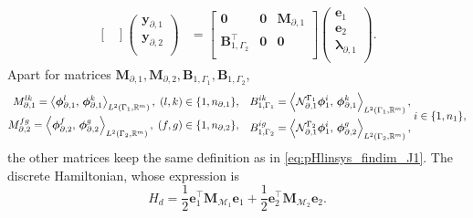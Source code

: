 \begin{equation}
\begin{aligned}
\begin{bmatrix}
\end{bmatrix}
\begin{pmatrix}
\mathbf{y}_{\partial, 1} \\
\mathbf{y}_{\partial, 2} \\
\end{pmatrix}
&= \begin{bmatrix}
\mathbf{0} & \mathbf{0} & \mathbf{M}_{\partial, 1} \\
\mathbf{B}_{1, \Gamma_2}^\top & \mathbf{0} & \mathbf{0} \\
\end{bmatrix}\begin{pmatrix}
\mathbf{e}_{1} \\
\mathbf{e}_{2} \\
{\bm{\lambda}}_{\partial, 1} \\
\end{pmatrix}.
\end{aligned}
\end{equation}
Apart for matrices $\mathbf{M}_{\partial, 1}, \mathbf{M}_{\partial, 2}, \mathbf{B}_{1, \Gamma_1}, \mathbf{B}_{1, \Gamma_2}$,
\begin{equation}
\begin{aligned}
{M}_{\partial, 1}^{lk} = \inner[L^2(\Gamma_1, \mathbb{R}^m)]{\bm{\phi}_{\partial, 1}^l}{\bm{\phi}_{\partial, 1}^k}, \; (l,k) \in \{1,n_{\partial, 1}\}, \\
{M}_{\partial, 2}^{fg} = \inner[L^2(\Gamma_2, \mathbb{R}^m)]{\bm{\phi}_{\partial, 2}^f}{\bm{\phi}_{\partial, 2}^g}, \; (f,g) \in \{1,n_{\partial, 2}\},\\
\end{aligned}  \quad
\begin{aligned}
{B}_{1, \Gamma_1}^{ik} = \inner[L^2(\Gamma_1, \mathbb{R}^m)]{\mathcal{N}_{\partial, 1}^{\Gamma_1}\bm{\phi}_{1}^i}{\bm{\phi}_{\partial, 1}^k}, \\
{B}_{1, \Gamma_2}^{ig} = \inner[L^2(\Gamma_2, \mathbb{R}^m)]{\mathcal{N}_{\partial, 1}^{\Gamma_2}\bm{\phi}_{1}^i}{\bm{\phi}_{\partial, 2}^g}, \\
\end{aligned} \; i \in \{1,n_1\},
\end{equation} 
the other matrices keep the same definition as in \eqref{eq:pHlinsys_findim_J1}. The discrete Hamiltonian, whose expression is \cite{beattie2018linear}
\begin{equation}
H_d = \frac{1}{2} \mathbf{e}_1^\top \mathbf{M}_{\mathcal{M}_1} \mathbf{e}_1 + \frac{1}{2} \mathbf{e}_2^\top \mathbf{M}_{\mathcal{M}_2} \mathbf{e}_2.
\end{equation}

